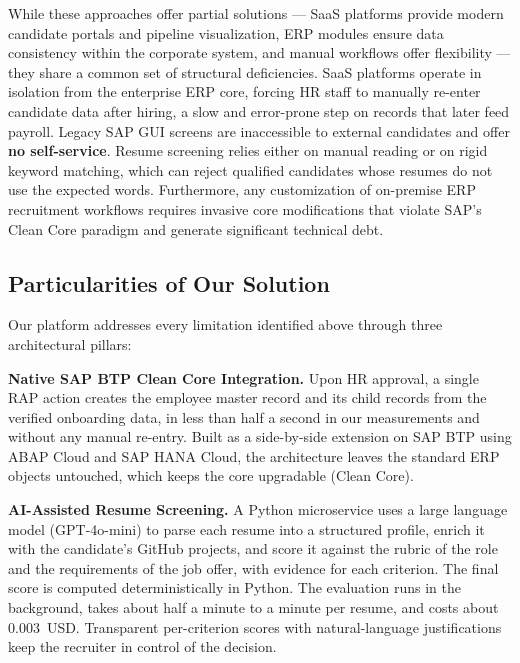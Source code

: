 While these approaches offer partial solutions --- SaaS platforms provide modern candidate portals and pipeline visualization, ERP modules ensure data consistency within the corporate system, and manual workflows offer flexibility --- they share a common set of structural deficiencies. SaaS platforms operate in isolation from the enterprise ERP core, forcing HR staff to manually re-enter candidate data after hiring, a slow and error-prone step on records that later feed payroll. Legacy SAP GUI screens are inaccessible to external candidates and offer \textbf{no self-service}. Resume screening relies either on manual reading or on rigid keyword matching, which can reject qualified candidates whose resumes do not use the expected words. Furthermore, any customization of on-premise ERP recruitment workflows requires invasive core modifications that violate SAP's Clean Core paradigm and generate significant technical debt.

\subsection{Particularities of Our Solution}
\label{subsec:solution_particularities}

Our platform addresses every limitation identified above through three architectural pillars:

\textbf{Native SAP BTP Clean Core Integration.} Upon HR approval, a single RAP action creates the employee master record and its child records from the verified onboarding data, in less than half a second in our measurements and without any manual re-entry. Built as a side-by-side extension on SAP BTP using ABAP Cloud and SAP HANA Cloud, the architecture leaves the standard ERP objects untouched, which keeps the core upgradable (Clean Core).

\textbf{AI-Assisted Resume Screening.} A Python microservice uses a large language model (GPT-4o-mini) to parse each resume into a structured profile, enrich it with the candidate's GitHub projects, and score it against the rubric of the role and the requirements of the job offer, with evidence for each criterion. The final score is computed deterministically in Python. The evaluation runs in the background, takes about half a minute to a minute per resume, and costs about 0.003~USD. Transparent per-criterion scores with natural-language justifications keep the recruiter in control of the decision.

